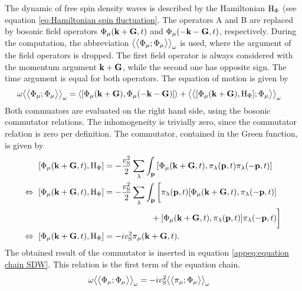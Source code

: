 The dynamic of free spin density waves is described by the Hamiltonian $\mathrm{H}_{\Phi}$ (see equation \eqref{eq:Hamiltonian spin fluctuation}.
The operators A and B are replaced by bosonic field operators $\Phi_{\mu}(\vb{k}+\vb{G},t)$ and $\Phi_{\mu}(-\vb{k}-\vb{G},t)$, respectively.
During the computation, the abbreviation $\big\langle\big\langle{\Phi_{\mu}};{\Phi_{\mu}}\big\rangle\big\rangle_{\omega}$ is used, where the argument of the field operators is dropped.
The first field operator is always considered with the momentum argument $\vb{k}+\vb{G}$, while the second one has opposite sign.
The time argument is equal for both operators.
The equation of motion is given by
%
\begin{align}
	\omega \green{\Phi_{\mu}}{\Phi_{\mu}}_{\omega} &= 
		\expval{\comm{\Phi_{\mu}(\vb{k}+\vb{G})}{\Phi_{\mu}(-\vb{k}-\vb{G})}}
		+
		\green{\comm{\Phi_{\mu}(\vb{k}+\vb{G})}{\mt{H}_{\Phi}}}{\Phi_{\mu}}_{\omega}
		\label{appeq:equation chain SDW}
\end{align}
%
Both commuators are evaluated on the right hand side, using the bosonic commutator relations.
The inhomogeneity is trivially zero, since the commutator relation is zero per definition.
The commutator, contained in the Green function, is given by
%
\begin{align}
	\comm{\Phi_{\mu}(\vb{k}+\vb{G},t)}{\mt{H}_{\Phi}} &= 
		-\frac{v_{\mt{S}}^{2}}{2}
		\sum\limits_{\lambda}
		\int_{\vb{p}}
		\comm{\Phi_{\mu}(\vb{k}+\vb{G},t)}{\pi_{\lambda}(\vb{p},t) \pi_{\lambda}(-\vb{p},t)}
	\notag \\
	\Leftrightarrow\ \comm{\Phi_{\mu}(\vb{k}+\vb{G},t)}{\mt{H}_{\Phi}} &= 
		-\frac{v_{\mt{S}}^{2}}{2} 
		\sum\limits_{\lambda}
		\int_{\vb{p}} \bigg[
			\pi_{\lambda}(\vb{p},t) \comm{\Phi_{\mu}(\vb{k}+\vb{G},t)}{\pi_{\lambda}(-\vb{p},t)}
			\notag \\& \hspace{2cm}
			+
			\comm{\Phi_{\mu}(\vb{k}+\vb{G},t)}{\pi_{\lambda}(\vb{p},t)} \pi_{\lambda}(-\vb{p},t)
		\bigg]
	\notag \\
	\Leftrightarrow\ \comm{\Phi_{\mu}(\vb{k}+\vb{G},t)}{\mt{H}_{\Phi}} &= 
		-i v_{\mt{S}}^{2} \pi_{\mu}(\vb{k}+\vb{G},t).
\end{align}
%
The obtained result of the commutator is inserted in equation \eqref{appeq:equation chain SDW}.
This relation is the first term of the equation chain.
%
\begin{align}
	\omega \big\langle\big\langle{\Phi_{\mu}};{\Phi_{\mu}}\big\rangle\big\rangle_{\omega} &= 
		-i v_{\mathrm{S}}^{2} \big\langle\big\langle{\pi_{\mu}};{\Phi_{\mu}}\big\rangle\big\rangle_{\omega}
	\label{appeq:first item of the chain}
\end{align}
